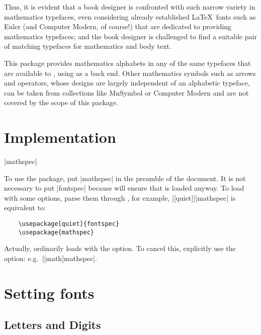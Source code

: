 \documentclass{ltxdockit}
\newcommand\permitbreak{\linebreak[0]}
\begin{document}
Thus, it is evident that a book designer is confronted with such narrow variety in mathematics typefaces, even considering already established \LaTeX\ fonts such as  Euler (and Computer Modern, of course!) that are dedicated to providing mathematics typefaces; and the book designer is challenged to find a suitable pair of matching typefaces for mathematics and body text.

This package provides mathematics alphabets in any of the same typefaces that are available to \XeTeX, using  as a back end. Other mathematics symbols such as arrows and operators, whose designs are largely independent of an alphabetic typeface, can be taken from collections like MnSymbol or Computer Modern and are not covered by the scope of this package.

\section{Implementation}

\begin{ltxsyntax}

|{mathspec}|

\noindent To use the package, put |{mathspec}| in the preamble of the document. It is not necessary to put |{fontspec}| because  will ensure that  is loaded anyway. To load  with some options, parse them through , for example, |[quiet]|\permitbreak|{mathspec}| is equivalent to:
\begin{verbatim}
    \usepackage[quiet]{fontspec}
    \usepackage{mathspec}
\end{verbatim}

Actually,  ordinarily loads  with the  option. To cancel this, explicitly use the  option: e.g.\ |[math]{mathspec}|.

\end{ltxsyntax}

\section{Setting fonts}

\subsection{Letters and Digits}
\end{document}
